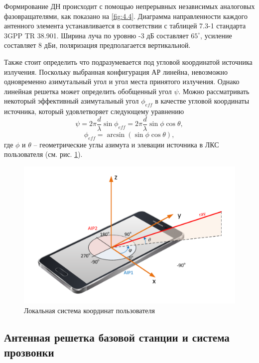 Формирование ДН происходит с помощью непрерывных независимых аналоговых фазовращателями, как показано
на \ref{fig:4.4}.  Диаграмма направленности каждого антенного элемента устанавливается в
соответствии с таблицей 7.3-1 стандарта 3GPP TR 38.901. Ширина луча по уровню -3
дБ составляет $65^\circ$, усиление составляет 8 дБи, поляризация предполагается вертикальной.





Также стоит определить что подразумевается под угловой координатой источника
излучения.  Поскольку выбранная конфигурация АР линейна, невозможно одновременно
азимутальный угол и угол места принятого излучения.  Однако линейная решетка
может определить обобщенный угол $\psi$. Можно рассматривать некоторый
эффективный азимутальный угол $\phi_{eff}$ в качестве угловой координаты
источника, который удовлетворяет следующему уравнению
\begin{equation}
    \label{eq:4.1}
    \psi = 2\pi \frac{d}{\lambda} \sin \phi_{eff} = 2\pi \frac{d}{\lambda} \sin\phi \cos{\theta},
\end{equation}
\begin{equation}
    \label{eq:4.2}
    \phi_{eff} = \arcsin(\sin \phi \cos \theta),
\end{equation}
где $\phi$ и $\theta$ -- геометрические углы азимута и элевации источника в ЛКС
пользователя (см. рис. \ref{fig:4.5}).

\begin{figure}[ht]
    \centering
    \includegraphics[width=0.75\linewidth]{figs/fig4.5}
    \caption{Локальная система координат пользователя}
    \label{fig:4.5}
\end{figure}

\subsection{Антенная решетка базовой станции и система прозвонки}

